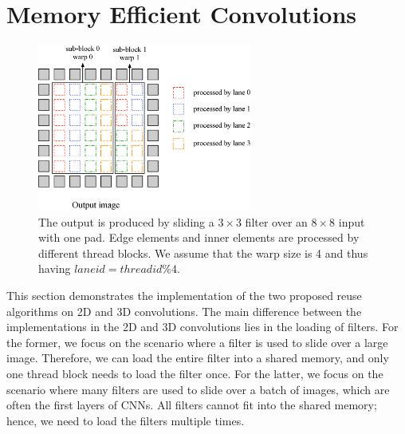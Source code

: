 \section{Memory Efficient Convolutions}
\begin{figure}
	\centering
	\includegraphics[width=0.9\columnwidth,height=5.5cm]{./figure/overalldesign.eps}
\caption{The output is produced by sliding a $3 \times 3$ filter over an $8 \times 8$ input with one pad. Edge elements and inner elements are processed by different thread blocks. We assume that the warp size is 4 and thus having $laneid=threadid\%4$.}
\label{fig:overalldesign}
\end{figure}


This section demonstrates the implementation of the two proposed reuse algorithms on 2D and 3D convolutions. The main difference between the
implementations in the 2D and 3D convolutions lies in the loading of filters. For the former, we focus on the scenario where a filter is used to
slide over a large image. Therefore, we can load the entire filter into a shared memory, and only one thread block needs to load the
filter once. For the latter, we focus on the scenario where many filters are used to slide over a batch of images, which are often the
first layers of CNNs. All filters cannot fit into the shared memory; hence, we need to load the filters multiple times.

